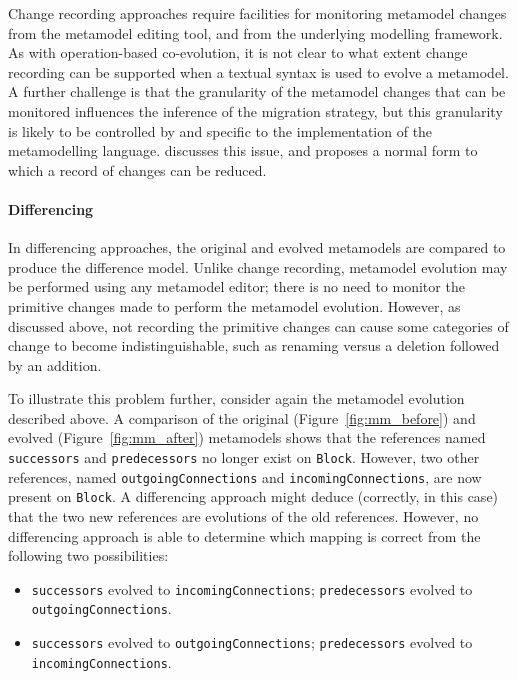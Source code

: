 Change recording approaches require facilities for monitoring metamodel changes from the metamodel editing tool, and from the underlying modelling framework. As with operation-based co-evolution, it is not clear to what extent change recording can be supported when a textual syntax is used to evolve a metamodel. A further challenge is that the granularity of the metamodel changes that can be monitored influences the inference of the migration strategy, but this granularity is likely to be controlled by and specific to the implementation of the metamodelling language. \cite{cicchetti08thesis} discusses this issue, and proposes a normal form to which a record of changes can be reduced.


\paragraph{Differencing}
In differencing approaches, the original and evolved metamodels are compared to produce the difference model. Unlike change recording, metamodel evolution may be performed using any metamodel editor; there is no need to monitor the primitive changes made to perform the metamodel evolution. However, as discussed above, not recording the primitive changes can cause some categories of change to become indistinguishable, such as renaming versus a deletion followed by an addition.

To illustrate this problem further, consider again the metamodel evolution described above. A comparison of the original (Figure~\ref{fig:mm_before}) and evolved (Figure~\ref{fig:mm_after}) metamodels shows that the references named \texttt{successors} and \texttt{predecessors} no longer exist on \texttt{Block}. However, two other references, named \texttt{out\-go\-ingCon\-nect\-ions} and \texttt{incomingConnections}, are now present on \texttt{Block}. A differencing approach might deduce (correctly, in this case) that the two new references are evolutions of the old references. However, no differencing approach is able to determine which mapping is correct from the following two possibilities:

\begin{itemize}
	\item \texttt{successors} evolved to \texttt{incomingConnections}; \texttt{predecessors} evolved to \texttt{outgoingConnections}.
	\item \texttt{successors} evolved to \texttt{outgoingConnections}; \texttt{predecessors} evolved to \texttt{incomingConnections}.
\end{itemize}

